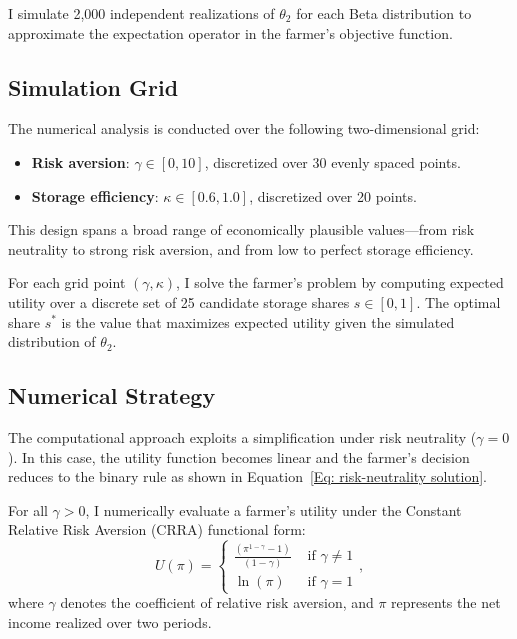 I simulate 2,000 independent realizations of $\theta_2$ for each Beta distribution to approximate the expectation operator in the farmer's objective function.


\subsection{Simulation Grid}
\noindent The numerical analysis is conducted over the following two-dimensional grid:
\begin{itemize}
\item \textbf{Risk aversion}: $\gamma \in [0, 10]$, discretized over 30 evenly spaced points.
\item \textbf{Storage efficiency}: $\kappa \in [0.6, 1.0]$, discretized over 20 points.
\end{itemize}

This design spans a broad range of economically plausible values—from risk neutrality to strong risk aversion, and from low to perfect storage efficiency.

For each grid point $(\gamma, \kappa)$, I solve the farmer's problem by computing expected utility over a discrete set of 25 candidate storage shares $s \in [0, 1]$. The optimal share $s^*$ is the value that maximizes expected utility given the simulated distribution of $\theta_2$.


\subsection{Numerical Strategy}
\noindent The computational approach exploits a simplification under risk neutrality ($\gamma = 0$). In this case, the utility function becomes linear and the farmer's decision reduces to the binary rule as shown in Equation~\ref{Eq: risk-neutrality solution}.

For all $\gamma > 0$, I numerically evaluate a farmer's utility under the Constant Relative Risk Aversion (CRRA) functional form:
\begin{equation}
U(\pi)=\left\{\begin{array}{ll}
\frac{\left(\pi^{1-\gamma}-1\right)}{(1-\gamma)} & \text { if } \gamma \neq 1 \\
\ln (\pi) & \text { if } \gamma=1
\end{array},\right.
\label{eq: CRRA}
\end{equation}
where $\gamma$ denotes the coefficient of relative risk aversion, and $\pi$ represents the net income realized over two periods. 

